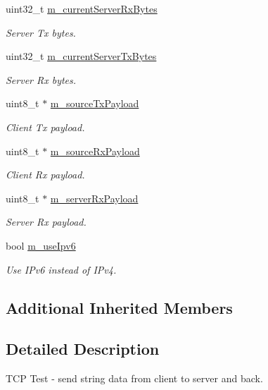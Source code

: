 \begin{DoxyCompactItemize}
uint32\+\_\+t \hyperlink{classTcpTestCase_aef99b385054dd7eb73a7e45b2ce3d976}{m\+\_\+current\+Server\+Rx\+Bytes}
\begin{DoxyCompactList}\small\item\em Server Tx bytes. \end{DoxyCompactList}\item 
uint32\+\_\+t \hyperlink{classTcpTestCase_a3a7557075e3c745e487f76f26bca6423}{m\+\_\+current\+Server\+Tx\+Bytes}
\begin{DoxyCompactList}\small\item\em Server Rx bytes. \end{DoxyCompactList}\item 
uint8\+\_\+t $\ast$ \hyperlink{classTcpTestCase_a04a966fbc1e4ab5a06cb67ce1279032b}{m\+\_\+source\+Tx\+Payload}
\begin{DoxyCompactList}\small\item\em Client Tx payload. \end{DoxyCompactList}\item 
uint8\+\_\+t $\ast$ \hyperlink{classTcpTestCase_ac6e1dba9cf4a200de57b4247d383bbf4}{m\+\_\+source\+Rx\+Payload}
\begin{DoxyCompactList}\small\item\em Client Rx payload. \end{DoxyCompactList}\item 
uint8\+\_\+t $\ast$ \hyperlink{classTcpTestCase_af1647be1c24b49579653f2c691bc802b}{m\+\_\+server\+Rx\+Payload}
\begin{DoxyCompactList}\small\item\em Server Rx payload. \end{DoxyCompactList}\item 
bool \hyperlink{classTcpTestCase_a0fd3d3053ba2a160fbc60f6d40b5fe25}{m\+\_\+use\+Ipv6}
\begin{DoxyCompactList}\small\item\em Use I\+Pv6 instead of I\+Pv4. \end{DoxyCompactList}\end{DoxyCompactItemize}
\subsection*{Additional Inherited Members}


\subsection{Detailed Description}
T\+CP Test -\/ send string data from client to server and back. 


